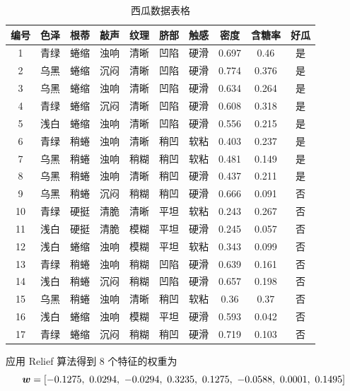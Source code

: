 \documentclass{article}
\begin{document}
\begin{table}[htbp]
  \centering
  \caption{西瓜数据表格}
  \label{tab:wm}
  \begin{tabular}{cccccccccc}
    \toprule
    编号 & 色泽 & 根蒂 & 敲声 & 纹理 & 脐部 & 触感 & 密度    & 含糖率   & 好瓜 \\
    \midrule
    1  & 青绿 & 蜷缩 & 浊响 & 清晰 & 凹陷 & 硬滑 & 0.697 & 0.46  & 是  \\
    2  & 乌黑 & 蜷缩 & 沉闷 & 清晰 & 凹陷 & 硬滑 & 0.774 & 0.376 & 是  \\
    3  & 乌黑 & 蜷缩 & 浊响 & 清晰 & 凹陷 & 硬滑 & 0.634 & 0.264 & 是  \\
    4  & 青绿 & 蜷缩 & 沉闷 & 清晰 & 凹陷 & 硬滑 & 0.608 & 0.318 & 是  \\
    5  & 浅白 & 蜷缩 & 浊响 & 清晰 & 凹陷 & 硬滑 & 0.556 & 0.215 & 是  \\
    6  & 青绿 & 稍蜷 & 浊响 & 清晰 & 稍凹 & 软粘 & 0.403 & 0.237 & 是  \\
    7  & 乌黑 & 稍蜷 & 浊响 & 稍糊 & 稍凹 & 软粘 & 0.481 & 0.149 & 是  \\
    8  & 乌黑 & 稍蜷 & 浊响 & 清晰 & 稍凹 & 硬滑 & 0.437 & 0.211 & 是  \\
    9  & 乌黑 & 稍蜷 & 沉闷 & 稍糊 & 稍凹 & 硬滑 & 0.666 & 0.091 & 否  \\
    10 & 青绿 & 硬挺 & 清脆 & 清晰 & 平坦 & 软粘 & 0.243 & 0.267 & 否  \\
    11 & 浅白 & 硬挺 & 清脆 & 模糊 & 平坦 & 硬滑 & 0.245 & 0.057 & 否  \\
    12 & 浅白 & 蜷缩 & 浊响 & 模糊 & 平坦 & 软粘 & 0.343 & 0.099 & 否  \\
    13 & 青绿 & 稍蜷 & 浊响 & 稍糊 & 凹陷 & 硬滑 & 0.639 & 0.161 & 否  \\
    14 & 浅白 & 稍蜷 & 沉闷 & 稍糊 & 凹陷 & 硬滑 & 0.657 & 0.198 & 否  \\
    15 & 乌黑 & 稍蜷 & 浊响 & 清晰 & 稍凹 & 软粘 & 0.36  & 0.37  & 否  \\
    16 & 浅白 & 蜷缩 & 浊响 & 模糊 & 平坦 & 硬滑 & 0.593 & 0.042 & 否  \\
    17 & 青绿 & 蜷缩 & 沉闷 & 稍糊 & 稍凹 & 硬滑 & 0.719 & 0.103 & 否 \\
    \bottomrule
  \end{tabular}
\end{table}

应用 Relief 算法得到 8 个特征的权重为
\begin{equation}
  \bm{w}=[-0.1275,~0.0294,~-0.0294,~0.3235,~0.1275,~-0.0588,~0.0001,~0.1495]
\end{equation}
\end{document}
